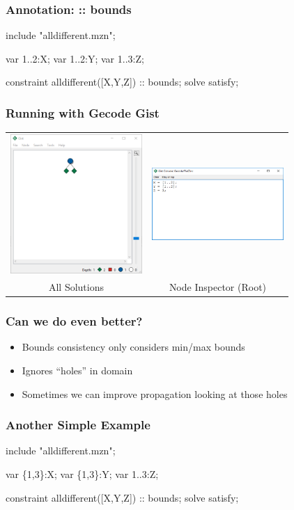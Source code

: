 \begin{frame}[fragile]
\frametitle{Annotation: :: bounds}
\begin{semiverbatim}
include "alldifferent.mzn";

var 1..2:X;
var 1..2:Y;
var 1..3:Z;

constraint alldifferent([X,Y,Z]) :: bounds;
solve satisfy;
\end{semiverbatim}
\end{frame}

\begin{frame}
  \frametitle{Running with Gecode Gist}
  \begin{tabular}{cc}
    \includegraphics[width=5cm]{../sudoku/images/xyzgist}
    &
    \includegraphics[width=5cm]{../sudoku/images/xyzgistinspector}
    \\
    All Solutions & Node Inspector (Root)
  \end{tabular}
\end{frame}


\begin{frame}
\frametitle{Can we do even better?}
\begin{itemize}
\item Bounds consistency only considers min/max bounds
\item Ignores ``holes'' in domain
\item Sometimes we can improve propagation looking at those holes
\end{itemize}
\end{frame}

\begin{frame}[fragile]
\frametitle{Another Simple Example}
\begin{semiverbatim}
include "alldifferent.mzn";

var \{1,3\}:X; %
var \{1,3\}:Y;
var 1..3:Z; %

constraint alldifferent([X,Y,Z]) :: bounds;
solve satisfy;
\end{semiverbatim}
\end{frame}

